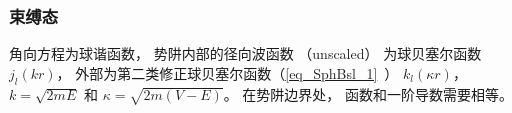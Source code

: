 
\begin{issues}
\issueDraft
\end{issues}


\subsubsection{束缚态}

角向方程为球谐函数， 势阱内部的径向波函数 （unscaled） 为球贝塞尔函数 $j_l(kr)$，  外部为第二类修正球贝塞尔函数（\autoref{eq_SphBsl_1}~） $k_l(\kappa r)$，   $k = \sqrt{2mE}$ 和 $\kappa = \sqrt{2m(V - E)}$。 在势阱边界处， 函数和一阶导数需要相等。 
